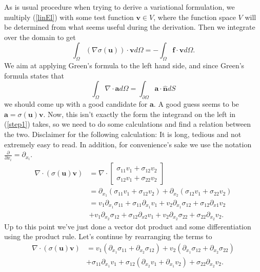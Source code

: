 \documentclass[paper=a4, fontsize=11pt]{scrartcl} %
\begin{document}
As is usual procedure when trying to derive a variational formulation, we multiply (\ref{linEl}) with some test function $\boldsymbol{v}\in V$, where the function space $V$ will be determined from what seems useful during the derivation. Then we integrate over the domain to get
\begin{equation}
\label{step1}
\int_{\Omega} (\nabla \sigma(\boldsymbol{u}))\cdot \boldsymbol{v}d\Omega = -\int_{\Omega}\boldsymbol{f}\cdot \boldsymbol{v} d\Omega .
\end{equation}
We aim at applying Green's formula to the left hand side, and since Green's formula states that
\begin{equation*}
\int_{\Omega}\nabla \cdot \boldsymbol{a}d\Omega = \int_{\partial \Omega} \boldsymbol{a}\cdot \boldsymbol{\hat{n}}dS 
\end{equation*}
we should come up with a good candidate for $\boldsymbol{a}$. A good guess seems to be $\boldsymbol{a} = \sigma(\boldsymbol{u})\boldsymbol{v}$. Now, this isn't exactly the form the integrand on the left in (\ref{step1}) takes, so we need to do some calculations and find a relation between the two. Disclaimer for the following calculation: It is long, tedious and not extremely easy to read. In addition, for convenience's sake we use the notation $\frac{\partial}{\partial x_i} = \partial_{x_i}$.
\begin{align*}
\nabla \cdot (\sigma(\boldsymbol{u})\boldsymbol{v}) &= \nabla \cdot \begin{bmatrix}
\sigma_{11}v_1 + \sigma_{12}v_2 \\
\sigma_{12}v_1 + \sigma_{22}v_2
\end{bmatrix}\\
&= \partial_{x_1}(\sigma_{11}v_1 + \sigma_{12}v_2) + \partial_{x_2}(\sigma_{12}v_1 + \sigma_{22}v_2) \\
&= v_1\partial_{x_1}\sigma_{11} + \sigma_{11}\partial_{x_1}v_1 + v_2\partial_{x_1}\sigma_{12} + \sigma_{12}\partial_{x1}v_2  \\
&+ v_1\partial_{x_2}\sigma_{12} + \sigma_{12}\partial_{x2}v_1 + v_2\partial_{x_2}\sigma_{22} + \sigma_{22}\partial_{x_2}v_2 .
\end{align*}
Up to this point we've just done a vector dot product and some differentiation using the product rule. Let's continue by rearranging the terms to
\begin{align*}
\nabla \cdot (\sigma(\boldsymbol{u})\boldsymbol{v})&= v_1(\partial_{x_1}\sigma_{11} + \partial_{x_2}\sigma_{12}) + v_2(\partial_{x_1}\sigma_{12} + \partial_{x_2}\sigma_{22}) \\
&+ \sigma_{11}\partial_{x_1}v_1 + \sigma_{12}(\partial_{x_2}v_1+\partial_{x_1}v_2)+\sigma_{22}\partial_{x_2}v_2 .
\end{align*}
\end{document}
